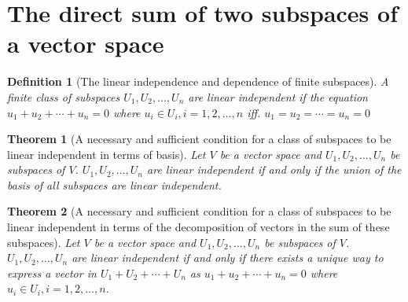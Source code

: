 \documentclass[onecolumn]{ctexart}
\newtheorem{definition}{Definition}
\newtheorem{theorem}{Theorem}
\begin{document}
\section{The direct sum of two subspaces of a vector space}

\begin{definition}[The linear independence and dependence of finite subspaces]
  A finite class of subspaces $U_1, U_2, \ldots, U_n$ are linear independent if the equation $u_1 + u_2 + \cdots + u_n = 0$ where $u_i \in U_i, i = 1,2,\ldots,n$ iff. $u_1 = u_2 = \cdots = u_n = 0$
\end{definition}

\begin{theorem}[A necessary and sufficient condition for a class of subspaces to be linear independent in terms of basis]
  Let $V$ be a vector space and $U_1, U_2, \ldots, U_n$ be subspaces of $V$. $U_1, U_2, \ldots, U_n$ are linear independent if and only if the union of the basis of all subspaces are linear independent.
\end{theorem}

\begin{theorem}[A necessary and sufficient condition for a class of subspaces to be linear independent in terms of the decomposition of vectors in the sum of these subspaces]
  Let $V$ be a vector space and $U_1, U_2, \ldots, U_n$ be subspaces of $V$. $U_1, U_2, \ldots, U_n$ are linear independent if and only if there exists a unique way to express a vector in $U_1 + U_2 + \cdots + U_n$ as $u_1 + u_2 + \cdots + u_n = 0$ where $u_i \in U_i, i = 1, 2, \ldots, n$.
\end{theorem}
\end{document}
